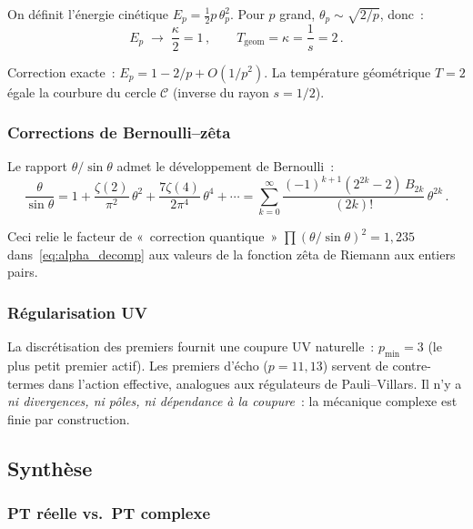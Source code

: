 \documentclass[12pt,a4paper]{article}
\begin{document}
On définit l'énergie cinétique $E_p = \frac{1}{2}p\,\theta_p^2$.
Pour $p$ grand, $\theta_p \sim \sqrt{2/p}$, donc~:
\begin{equation}
  E_p \;\to\; \frac{\kappa}{2} = 1\,,\qquad
  T_{\mathrm{geom}} = \kappa = \frac{1}{s} = 2\,.
  \label{eq:equipartition}
\end{equation}

Correction exacte~: $E_p = 1 - 2/p + O(1/p^2)$.
La température géométrique $T = 2$ égale la courbure du cercle
$\mathcal{C}$ (inverse du rayon $s = 1/2$).

\subsubsection{Corrections de Bernoulli--zêta}

Le rapport $\theta/\sin\theta$ admet le développement de Bernoulli~:
\begin{equation}
  \frac{\theta}{\sin\theta}
  = 1 + \frac{\zeta(2)}{\pi^2}\,\theta^2
    + \frac{7\zeta(4)}{2\pi^4}\,\theta^4
    + \cdots
  = \sum_{k=0}^{\infty} \frac{(-1)^{k+1}(2^{2k}-2)\,B_{2k}}{(2k)!}\,\theta^{2k}\,.
  \label{eq:bernoulli}
\end{equation}

Ceci relie le facteur de «~correction quantique~»
$\prod(\theta/\sin\theta)^2 = 1{,}235$ dans~\eqref{eq:alpha_decomp}
aux valeurs de la fonction zêta de Riemann aux entiers pairs.

\subsubsection{Régularisation UV}

La discrétisation des premiers fournit une coupure UV naturelle~:
$p_{\min} = 3$ (le plus petit premier actif). Les premiers d'écho
($p = 11, 13$) servent de contre-termes dans l'action effective,
analogues aux régulateurs de Pauli--Villars. Il n'y a \emph{ni
divergences, ni pôles, ni dépendance à la coupure}~: la mécanique
complexe est finie par construction.


\subsection{Synthèse}
\label{sec:cx_synthesis}

\subsubsection{PT réelle vs.\ PT complexe}
\end{document}
